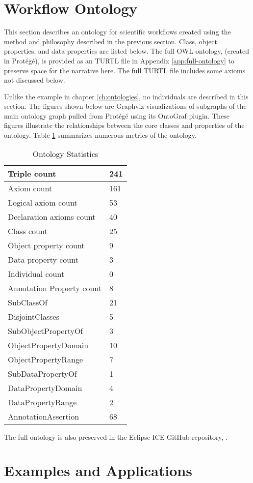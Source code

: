 \section{Workflow Ontology}
\label{workflow-ont-section}

This section describes an ontology for scientific workflows created using the
method and philosophy described in the previous section. Class, object
properties, and data properties are listed below. The full OWL ontology,
(created in Prot\'eg\'e), is provided as an TURTL file in Appendix
\ref{app:full-ontology} to preserve space for the narrative here. The full
TURTL file includes some axioms not discussed below. 

Unlike the example in chapter \ref{ch:ontologies}, no individuals are described
in this section. The figures shown below are Graphviz visualizations of
subgraphs of the main ontology graph pulled from Prot\'eg\'e using its OntoGraf
plugin. These figures illustrate the relationships between the core classes and
properties of the ontology. Table \ref{ont-stats-table} summarizes numerous
metrics of the ontology.

\begin{table}[H]
\begin{tabularx}{\textwidth}{|X|X|}
\hline
Triple count & 241 \tabularnewline\hline
Axiom count	& 161	\tabularnewline\hline
Logical axiom count	& 53	\tabularnewline\hline
Declaration axioms count &	40	\tabularnewline\hline
Class count	& 25	\tabularnewline\hline
Object property count	& 9	\tabularnewline\hline
Data property count	& 3	\tabularnewline\hline
Individual count &	0	\tabularnewline\hline
Annotation Property count	& 8 \tabularnewline\hline
SubClassOf	& 21		\tabularnewline\hline
DisjointClasses  &	5 \tabularnewline\hline
SubObjectPropertyOf	& 3 \tabularnewline\hline
ObjectPropertyDomain &	10	\tabularnewline\hline
ObjectPropertyRange	& 7 \tabularnewline\hline
SubDataPropertyOf	& 1 \tabularnewline\hline
DataPropertyDomain	& 4	\tabularnewline\hline
DataPropertyRange &	2 \tabularnewline\hline
AnnotationAssertion	& 68 \tabularnewline\hline
\end{tabularx}
\caption{Ontology Statistics}
\label{ont-stats-table}
\end{table}

The full ontology is also preserved in the Eclipse ICE GitHub repository,
\cite{eclipse-ice-github}.


\section{Examples and Applications}
\label{workflow-ont-examples}

